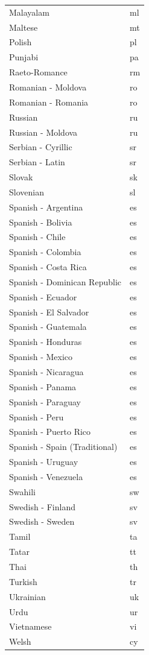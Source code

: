 \documentclass[
  12pt,
]{krantz}
\begin{document}
\begin{longtable}[t]{ll}
Malayalam & ml\\
Maltese & mt\\
Polish & pl\\
Punjabi & pa\\
\addlinespace
Raeto-Romance & rm\\
Romanian - Moldova & ro\\
Romanian - Romania & ro\\
Russian & ru\\
Russian - Moldova & ru\\
\addlinespace
Serbian - Cyrillic & sr\\
Serbian - Latin & sr\\
Slovak & sk\\
Slovenian & sl\\
Spanish - Argentina & es\\
\addlinespace
Spanish - Bolivia & es\\
Spanish - Chile & es\\
Spanish - Colombia & es\\
Spanish - Costa Rica & es\\
Spanish - Dominican Republic & es\\
\addlinespace
Spanish - Ecuador & es\\
Spanish - El Salvador & es\\
Spanish - Guatemala & es\\
Spanish - Honduras & es\\
Spanish - Mexico & es\\
\addlinespace
Spanish - Nicaragua & es\\
Spanish - Panama & es\\
Spanish - Paraguay & es\\
Spanish - Peru & es\\
Spanish - Puerto Rico & es\\
\addlinespace
Spanish - Spain (Traditional) & es\\
Spanish - Uruguay & es\\
Spanish - Venezuela & es\\
Swahili & sw\\
Swedish - Finland & sv\\
\addlinespace
Swedish - Sweden & sv\\
Tamil & ta\\
Tatar & tt\\
Thai & th\\
Turkish & tr\\
\addlinespace
Ukrainian & uk\\
Urdu & ur\\
Vietnamese & vi\\
Welsh & cy\\*
\end{longtable}
\end{document}
